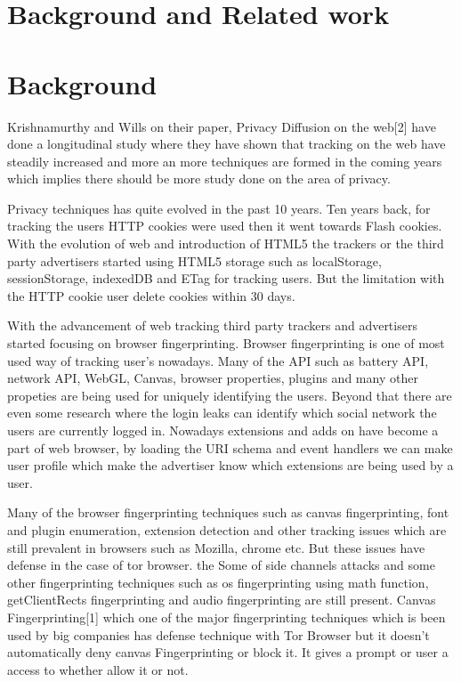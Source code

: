 \documentclass[conference]{IEEEtran}
\begin{document}
\section{Background and Related work}
\section*{Background}
Krishnamurthy and Wills on their paper, Privacy Diffusion on the web[2] have done a longitudinal study where they have shown that tracking on the web have steadily increased and more an more techniques are formed in the coming years which implies there should be more study done on the area of privacy.

Privacy techniques has quite evolved in the past 10 years. Ten years back, for tracking the users HTTP cookies were used then it went towards Flash cookies. With the evolution of web and introduction of HTML5 the trackers or the third party advertisers started using HTML5 storage such as localStorage, sessionStorage, indexedDB and ETag for tracking users. But the limitation with the HTTP cookie user delete cookies within 30 days. 

With the advancement of web tracking third party trackers and advertisers started focusing on browser fingerprinting. Browser fingerprinting is one of most used way of tracking user's nowadays. Many of the API such as battery API, network API, WebGL, Canvas, browser properties, plugins and many other propeties are being used for uniquely identifying the users. Beyond that there are even some research where the login leaks can identify which social network the users are currently logged in. Nowadays extensions and adds on have become a part of web browser, by loading the URI schema and event handlers we can make user profile which make the advertiser know which extensions are being used by a user.

Many of the browser fingerprinting techniques such as canvas fingerprinting, font and plugin enumeration, extension detection and other tracking issues which are still prevalent in browsers such as Mozilla, chrome etc. But these issues have defense in the case of tor browser.  the Some of side channels attacks and some other fingerprinting techniques such as os fingerprinting using math function, getClientRects fingerprinting and audio fingerprinting are still present. Canvas Fingerprinting[1] which one of the major fingerprinting techniques which is been used by big companies has defense technique with Tor Browser but  it doesn't automatically deny canvas Fingerprinting or block it. It gives a prompt or user a access to whether allow it or not.
\end{document}
